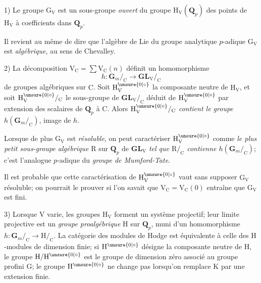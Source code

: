 1) Le groupe $\mathrm G_{\mathrm V}$ est un sous-groupe \textit{ouvert} du groupe $\mathrm H_{\mathrm V}(\mathbf Q_p)$ des points de $\mathrm H_{\mathrm V}$ à coefficients dans $\mathbf Q_p$.

Il revient au même de dire que l'algèbre de Lie du groupe analytique $p$-adique $\mathrm G_{\mathrm V}$ est \textit{algébrique}, au sens de Chevalley.

2) La décomposition $\mathrm V_{\mathrm C}=\sum\mathrm V_{\mathrm C}(n)$ définit un homomorphisme
\[
h:\mathbf G_m/_{\mathrm C}\to\mathbf{GL}_{\mathrm V}/_{\mathrm C}
\]
de groupes algébriques sur $\mathrm C$. Soit $\mathrm H_{\mathrm V}^{\unsure{0|\circ}}$ la composante neutre de $\mathrm H_{\mathrm V}$, et soit $\mathrm H_{\mathrm V}^{\unsure{0|\circ}}/_{\mathrm C}$ le sous-groupe de $\mathbf{GL}_{\mathrm V}/_{\mathrm C}$ déduit de $\mathrm H_{\mathrm V}^{\unsure{0|\circ}}$ par extension des scalaires de $\mathbf Q_p$ à $\mathrm C$. Alors \textit{$\mathrm H_{\mathrm V}^{\unsure{0|\circ}}/_{\mathrm C}$ contient le groupe $h(\mathbf G_m/_{\mathrm C})$}, image de $h$.

Lorsque de plus $\mathrm G_{\mathrm V}$ est \textit{résoluble}, on peut caractériser $\mathrm H_{\mathrm V}^{\unsure{0|\circ}}$ comme \textit{le plus petit sous-groupe algébrique} $\mathrm R$ sur $\mathbf Q_p$ de $\mathbf{GL}_{\mathrm V}$ \textit{tel que $\mathrm R/_{\mathrm C}$ contienne $h(\mathbf G_m/_{\mathrm C})$}; c'est l'analogue $p$-adique du \textit{groupe de Mumford-Tate}.

Il est probable que cette caractérisation de $\mathrm H_{\mathrm V}^{\unsure{0|\circ}}$ vaut sans supposer $\mathrm G_{\mathrm V}$ résoluble; on pourrait le prouver si l'on savait que $\mathrm V_{\mathrm C}=\mathrm V_{\mathrm C}(0)$ entraîne que $\mathrm G_{\mathrm V}$ est fini.

3) Lorsque $\mathrm V$ varie, les groupes $\mathrm H_{\mathrm V}$ forment un système projectif; leur limite projective est un \textit{groupe proalgébrique} $\mathrm H$ sur $\mathbf Q_p$, muni d'un homomorphisme $h:\mathbf G_m/_{\mathrm C}\to\mathrm H/_{\mathrm C}$. La catégorie des modules de Hodge est équivalente à celle des $\mathrm H$-modules de dimension finie; si $\mathrm H^{\unsure{0|\circ}}$ désigne la composante neutre de $\mathrm H$, le groupe $\mathrm H/\mathrm H^{\unsure{0|\circ}}$ est le groupe de dimension zéro associé au groupe profini $\mathrm G$; le groupe $\mathrm H^{\unsure{0|\circ}}$ ne change pas lorsqu'on remplace $\mathrm K$ par une extension finie.

